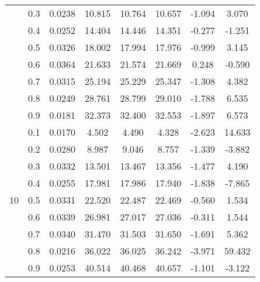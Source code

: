 \documentclass[11pt,a4paper]{report}
\begin{document}
\begin{longtable}{ | c | c || c | c | c | c | c | c | }
 & 0.3 & 0.0238 & 10.815 & 10.764 & 10.657 & -1.094 & 3.070 \\
 & 0.4 & 0.0252 & 14.404 & 14.446 & 14.351 & -0.277 & -1.251 \\
 & 0.5 & 0.0326 & 18.002 & 17.994 & 17.976 & -0.999 & 3.145 \\
 & 0.6 & 0.0364 & 21.633 & 21.574 & 21.669 & 0.248 & -0.590 \\
 & 0.7 & 0.0315 & 25.194 & 25.229 & 25.347 & -1.308 & 4.382 \\
 & 0.8 & 0.0249 & 28.761 & 28.799 & 29.010 & -1.788 & 6.535 \\
 & 0.9 & 0.0181 & 32.373 & 32.400 & 32.553 & -1.897 & 6.573 \\
 \hline
\multirow{9}{*}{10} & 0.1 & 0.0170 & 4.502 & 4.490 & 4.328 & -2.623 & 14.633 \\
 & 0.2 & 0.0280 & 8.987 & 9.046 & 8.757 & -1.339 & -3.882 \\
 & 0.3 & 0.0332 & 13.501 & 13.467 & 13.356 & -1.477 & 4.190 \\
 & 0.4 & 0.0255 & 17.981 & 17.986 & 17.940 & -1.838 & -7.865 \\
 & 0.5 & 0.0331 & 22.520 & 22.487 & 22.469 & -0.560 & 1.534 \\
 & 0.6 & 0.0339 & 26.981 & 27.017 & 27.036 & -0.311 & 1.544 \\
 & 0.7 & 0.0340 & 31.470 & 31.503 & 31.650 & -1.691 & 5.362 \\
 & 0.8 & 0.0216 & 36.022 & 36.025 & 36.242 & -3.971 & 59.432 \\
 & 0.9 & 0.0253 & 40.514 & 40.468 & 40.657 & -1.101 & -3.122 \\
 \hline
\hline
\end{longtable}
\end{document}
